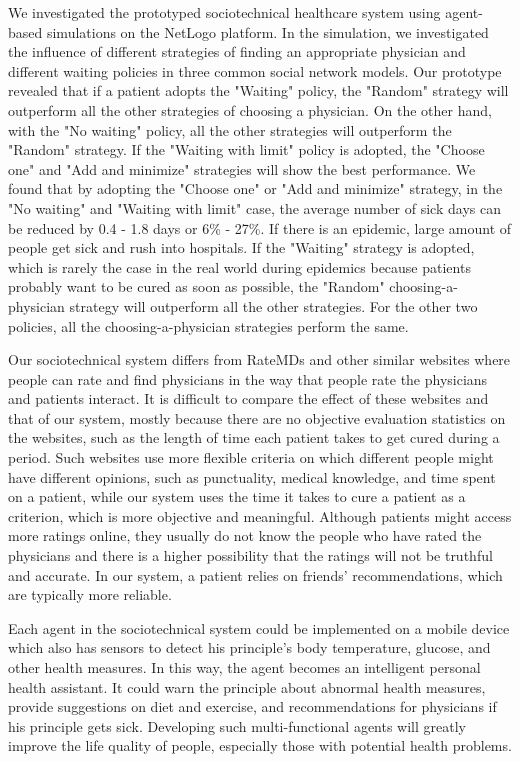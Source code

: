 We investigated the prototyped sociotechnical healthcare system using agent-based simulations on the NetLogo platform. In the simulation, we investigated the influence of different strategies of finding an appropriate physician and different waiting policies in three common social network models. Our prototype revealed that if a patient adopts the "Waiting" policy, the "Random" strategy will outperform all the other strategies of choosing a physician. On the other hand, with the "No waiting" policy, all the other strategies will outperform the "Random" strategy. If the "Waiting with limit" policy is adopted, the "Choose one" and "Add and minimize" strategies will show the best performance. We found that by adopting the "Choose one" or "Add and minimize" strategy, in the "No waiting" and "Waiting with limit" case, the average number of sick days can be reduced by 0.4 - 1.8 days or 6\% - 27\%. If there is an epidemic, large amount of people get sick and rush into hospitals. If the "Waiting" strategy is adopted, which is rarely the case in the real world during epidemics because patients probably want to be cured as soon as possible, the "Random" choosing-a-physician strategy will outperform all the other strategies. For the other two policies, all the choosing-a-physician strategies perform the same.  

Our sociotechnical system differs from RateMDs and other similar websites where people can rate and find physicians in the way that people rate the physicians and patients interact. It is difficult to compare the effect of these websites and that of our system, mostly because there are no objective evaluation statistics on the websites, such as the length of time each patient takes to get cured during a period. Such websites use more flexible criteria on which different people might have different opinions, such as punctuality, medical knowledge, and time spent on a patient, while our system uses the time it takes to cure a patient as a criterion, which is more objective and meaningful. Although patients might access more ratings online, they usually do not know the people who have rated the physicians and there is a higher possibility that the ratings will not be truthful and accurate. In our system, a patient relies on friends' recommendations, which are typically more reliable.

Each agent in the sociotechnical system could be implemented on a mobile device which also has sensors to detect his principle's body temperature, glucose, and other health measures. In this way, the agent becomes an intelligent personal health assistant. It could warn the principle about abnormal health measures, provide suggestions on diet and exercise, and recommendations for physicians if his principle gets sick. Developing such multi-functional agents will greatly improve the life quality of people, especially those with potential health problems. 
